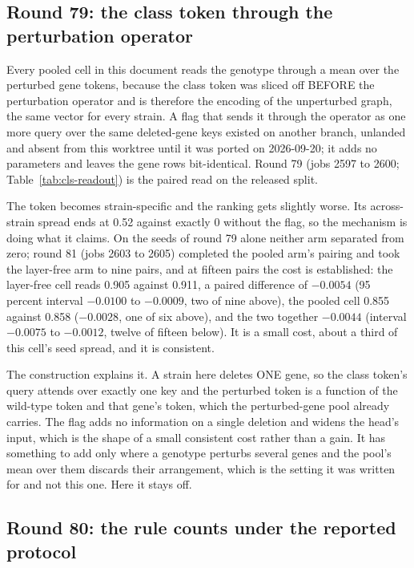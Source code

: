 \subsection{Round 79: the class token through the perturbation operator}
\label{sec:round79}

Every pooled cell in this document reads the genotype through a mean over the perturbed
gene tokens, because the class token was sliced off BEFORE the perturbation operator and
is therefore the encoding of the unperturbed graph, the same vector for every strain. A
flag that sends it through the operator as one more query over the same deleted-gene keys
existed on another branch, unlanded and absent from this worktree until it was ported on
2026-09-20; it adds no parameters and leaves the gene rows bit-identical. Round 79 (jobs
2597 to 2600; Table~\ref{tab:cls-readout}) is the paired read on the released split.

The token becomes strain-specific and the ranking gets slightly worse. Its across-strain
spread ends at 0.52 against exactly 0 without the flag, so the mechanism is doing what it
claims. On the seeds of round 79 alone neither arm separated from zero; round 81 (jobs
2603 to 2605) completed the pooled arm's pairing and took the layer-free arm to nine
pairs, and at fifteen pairs the cost is established: the layer-free cell reads 0.905
against 0.911, a paired difference of $-0.0054$ (95 percent interval $-0.0100$ to
$-0.0009$, two of nine above), the pooled cell 0.855 against 0.858 ($-0.0028$, one of
six above), and the two together $-0.0044$ (interval $-0.0075$ to $-0.0012$, twelve of
fifteen below). It is a small cost, about a third of this cell's seed spread, and it is
consistent.

The construction explains it. A strain here deletes ONE gene, so the class token's query
attends over exactly one key and the perturbed token is a function of the wild-type token
and that gene's token, which the perturbed-gene pool already carries. The flag adds no
information on a single deletion and widens the head's input, which is the shape of a
small consistent cost rather than a gain. It has something to add only where a genotype
perturbs several genes and the pool's mean over them discards their arrangement, which is
the setting it was written for and not this one. Here it stays off.



\subsection{Round 80: the rule counts under the reported protocol}
\label{sec:round80}

